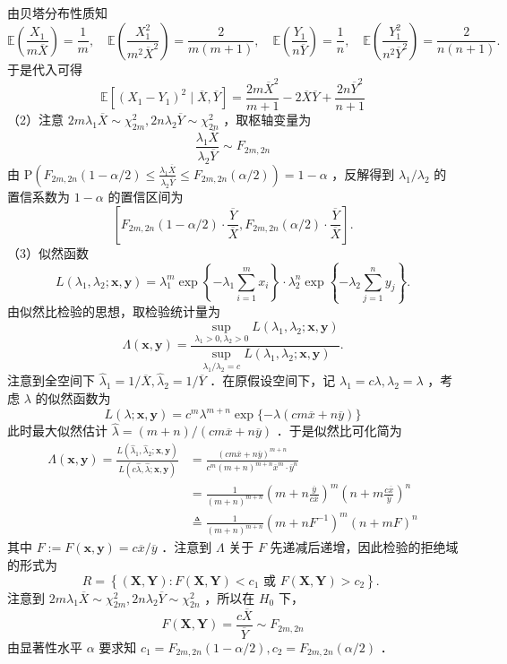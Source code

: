 \documentclass[UTF8]{ctexart}
\begin{document}
由贝塔分布性质知
$$
\mathbb{E}\left(\frac{X_1}{m \overline{X}}\right)=\frac{1}{m}, \quad \mathbb{E}\left(\frac{X_1^2}{m^2 \overline{X}^2}\right)=\frac{2}{m(m+1)}, \quad \mathbb{E}\left(\frac{Y_1}{n \overline{Y}}\right)=\frac{1}{n}, \quad \mathbb{E}\left(\frac{Y_1^2}{n^2 \overline{Y}^2}\right)=\frac{2}{n(n+1)} .
$$
于是代入可得
$$
\mathbb{E}\left[\left(X_1-Y_1\right)^2 \mid \overline{X}, \overline{Y}\right]=\frac{2 m \overline{X}^2}{m+1}-2 \overline{X} \overline{Y}+\frac{2 n \overline{Y}^2}{n+1}
$$
（2）注意 $2 m \lambda_1 \overline{X} \sim \chi_{2 m}^2, 2 n \lambda_2 \overline{Y} \sim \chi_{2 n}^2$ ，取枢轴变量为
$$
\frac{\lambda_1 \overline{X}}{\lambda_2 \overline{Y}} \sim F_{2 m, 2 n}
$$
由 $\mathrm{P}\left(F_{2 m, 2 n}(1-\alpha / 2) \leq \frac{\lambda_1 \overline{X}}{\lambda_2 \overline{Y}} \leq F_{2 m, 2 n}(\alpha / 2)\right)=1-\alpha$ ，反解得到 $\lambda_1 / \lambda_2$ 的置信系数为 $1-\alpha$ 的置信区间为
$$
\left[F_{2 m, 2 n}(1-\alpha / 2) \cdot \frac{\overline{Y}}{\overline{X}}, F_{2 m, 2 n}(\alpha / 2) \cdot \frac{\overline{Y}}{\overline{X}}\right] .
$$
（3）似然函数
$$
L\left(\lambda_1, \lambda_2 ; \boldsymbol{x}, \boldsymbol{y}\right)=\lambda_1^m \exp \left\{-\lambda_1 \sum_{i=1}^m x_i\right\} \cdot \lambda_2^n \exp \left\{-\lambda_2 \sum_{j=1}^n y_j\right\} .
$$
由似然比检验的思想，取检验统计量为
\[
\Lambda(\boldsymbol{x}, \boldsymbol{y})=\frac{\sup _{\lambda_1>0, \lambda_2>0} L\left(\lambda_1, \lambda_2 ; \boldsymbol{x}, \boldsymbol{y}\right)}{\sup _{\lambda_1 / \lambda_2=c} L\left(\lambda_1, \lambda_2 ; \boldsymbol{x}, \boldsymbol{y}\right)} .
\]
注意到全空间下 $\hat{\lambda}_1=1 / \overline{X}, \hat{\lambda}_2=1 / \overline{Y}$ ．在原假设空间下，记 $\lambda_1=c \lambda, \lambda_2=\lambda$ ，考虑 $\lambda$ 的似然函数为
$$
L(\lambda ; \boldsymbol{x}, \boldsymbol{y})=c^m \lambda^{m+n} \exp \{-\lambda(c m \overline{x}+n \overline{y})\}
$$
此时最大似然估计 $\hat{\lambda}=(m+n) /(c m \overline{x}+n \overline{y})$ ．于是似然比可化简为
$$
\begin{aligned}
	\Lambda(\boldsymbol{x}, \boldsymbol{y})=\frac{L\left(\hat{\lambda}_1, \hat{\lambda}_2 ; \boldsymbol{x}, \boldsymbol{y}\right)}{L(c \hat{\lambda}, \hat{\lambda} ; \boldsymbol{x}, \boldsymbol{y})} & =\frac{(c m \overline{x}+n \overline{y})^{m+n}}{c^m(m+n)^{m+n} \overline{x}^m \cdot \overline{y}^n} \\
	& =\frac{1}{(m+n)^{m+n}}\left(m+n \frac{\overline{y}}{c \overline{x}}\right)^m\left(n+m \frac{c \overline{x}}{\overline{y}}\right)^n \\
	& \triangleq \frac{1}{(m+n)^{m+n}}\left(m+n F^{-1}\right)^m(n+m F)^n
\end{aligned}
$$
其中 $F:=F(\boldsymbol{x}, \boldsymbol{y})=c \overline{x} / \overline{y}$ ．注意到 $\Lambda$ 关于 $F$ 先递减后递增，因此检验的拒绝域的形式为
$$
R=\left\{(\boldsymbol{X}, \boldsymbol{Y}): F(\boldsymbol{X}, \boldsymbol{Y})<c_1 \text { 或 } F(\boldsymbol{X}, \boldsymbol{Y})>c_2\right\} \text {. }
$$
注意到 $2 m \lambda_1 \overline{X} \sim \chi_{2 m}^2, 2 n \lambda_2 \overline{Y} \sim \chi_{2 n}^2$ ，所以在 $H_0$ 下，
$$
F(\boldsymbol{X}, \boldsymbol{Y})=\frac{c \overline{X}}{\overline{Y}} \sim F_{2 m, 2 n}
$$
由显著性水平 $\alpha$ 要求知 $c_1=F_{2 m, 2 n}(1-\alpha / 2), c_2=F_{2 m, 2 n}(\alpha / 2)$ ．	
	
	
	
	
\end{document}

